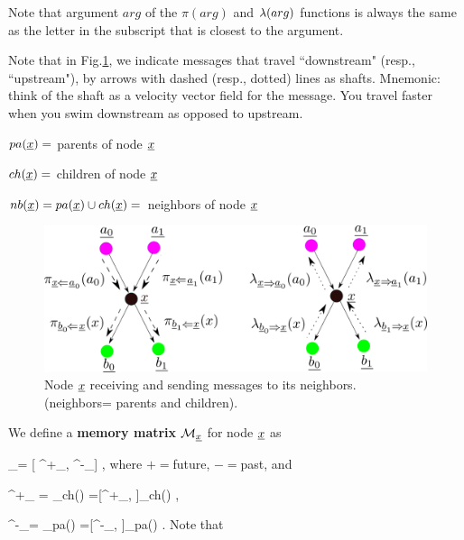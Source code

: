 Note that argument $arg$ of the $\pi(arg)$
and $\lambda(arg)$
functions is always the same
as the letter in the subscript
that is closest to the argument.

Note that in Fig.\ref{fig-pi-lam},
we indicate
messages that travel
``downstream"
(resp., ``upstream"), by
arrows with dashed (resp., dotted)
 lines as shafts.
Mnemonic: think of the shaft as a
 velocity vector field
for the message.
You travel faster when
you swim downstream as opposed
to upstream.

$pa({\underline{x}})=$ parents of node ${\underline{x}}$

$ch({\underline{x}})=$ children of node ${\underline{x}}$

$nb({\underline{x}})=pa({\underline{x}})\cup ch({\underline{x}})=$
neighbors of node ${\underline{x}}$



\begin{figure}[h!]
\centering
\includegraphics[width=6in]{mpass/pi-lam.png}
\caption{Node ${\underline{x}}$ receiving
and sending messages to
 its neighbors. (neighbors=
parents and children).
}
\label{fig-pi-lam}
\end{figure}


We define a {\bf memory matrix}
${\cal M}_{{\underline{x}}}$ for node ${\underline{x}}$
as

\beq
\calm_{\rvx}=
[
\calm^+_{\rvx},
\calm^-_{\rvx}]
\;,
\eeq
where $+=$future, $-=$past, and 

\beq
\calm^+_{ \rvx}=
_{\rvb\in ch(\rvx)}
=[\calm^+_{\rvb, \rvx}]_{\rvb\in ch(\rvx)}
\;,
\eeq

\beq
\calm^-_{\rvx}=
_{\rva\in  pa(\rvx)}
=[\calm^-_{\rvx, \rva}]_{\rva\in pa(\rvx)}
\;.
\eeq 
Note that

